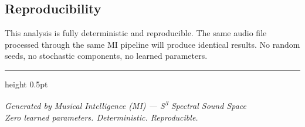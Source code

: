 \documentclass[11pt]{article}
\begin{document}
\subsection{Reproducibility}
This analysis is fully deterministic and reproducible. The same audio file processed through the same MI pipeline will produce identical results. No random seeds, no stochastic components, no learned parameters.

\vspace{2em}
\hrule height 0.5pt
\vspace{0.5em}
\begin{center}
\small\textit{Generated by Musical Intelligence (MI) --- S\textsuperscript{3} Spectral Sound Space}\\
\small\textit{Zero learned parameters. Deterministic. Reproducible.}
\end{center}
\end{document}
